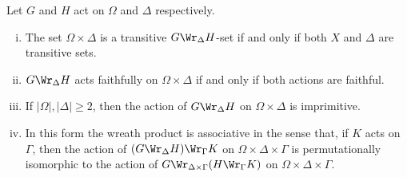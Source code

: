 \begin{proposition}
	Let $G$ and $H$ act on $\Omega$ and $\Delta$ respectively. 
	\begin{enumerate}[(i)]
		\item The set $\Omega\times \Delta$ is a transitive $G\Wr_\Delta H$-set if and only if both $X$ and $\Delta$ are transitive sets.
		\item  $G\Wr_\Delta H$ acts faithfully on $\Omega\times \Delta$ if and only if both actions are faithful.
		\item If $|\Omega|,|\Delta|\geq 2$, then the action of $G\Wr_\Delta H$ on $\Omega\times \Delta$ is imprimitive.
		\item In this form the wreath product is associative in the sense that, if $K$ acts on $\Gamma$, then the action of $(G\Wr_\Delta H) \Wr_\Gamma K$ on $\Omega\times \Delta \times \Gamma$  is permutationally isomorphic to the action of $G\Wr_{\Delta\times \Gamma} (H \Wr_\Gamma K)$ on $\Omega\times \Delta \times \Gamma$.
	\end{enumerate}
\end{proposition}

\begin{sketch}
	
\end{sketch}

\begin{remark}
	
\end{remark}

